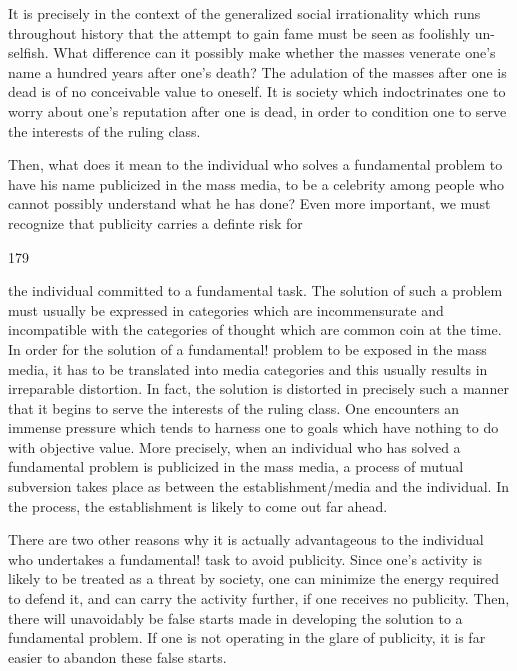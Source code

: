 \documentclass[10pt,twoside]{memoir}
\begin{document}
\begin{enumerate}
{{It is precisely in the context of the generalized social irrationality which 
runs throughout history that the attempt to gain fame must be seen as 
foolishly un-selfish. What difference can it possibly make whether the masses 
venerate one's name a hundred years after one's death? The adulation of the 
masses after one is dead is of no conceivable value to oneself. It is society 
which indoctrinates one to worry about one's reputation after one is dead, in 
order to condition one to serve the interests of the ruling class. 

Then, what does it mean to the individual who solves a fundamental 
problem to have his name publicized in the mass media, to be a celebrity 
among people who cannot possibly understand what he has done? Even 
more important, we must recognize that publicity carries a definte risk for 


179 


the individual committed to a fundamental task. The solution of such a 
problem must usually be expressed in categories which are incommensurate 
and incompatible with the categories of thought which are common coin at 
the time. In order for the solution of a fundamental! problem to be exposed 
in the mass media, it has to be translated into media categories and this 
usually results in irreparable distortion. In fact, the solution is distorted in 
precisely such a manner that it begins to serve the interests of the ruling 
class. One encounters an immense pressure which tends to harness one to 
goals which have nothing to do with objective value. More precisely, when an 
individual who has solved a fundamental problem is publicized in the mass 
media, a process of mutual subversion takes place as between the 
establishment/media and the individual. In the process, the establishment is 
likely to come out far ahead. 

There are two other reasons why it is actually advantageous to the 
individual who undertakes a fundamental! task to avoid publicity. Since one's 
activity is likely to be treated as a threat by society, one can minimize the 
energy required to defend it, and can carry the activity further, if one 
receives no publicity. Then, there will unavoidably be false starts made in 
developing the solution to a fundamental problem. If one is not operating in 
the glare of publicity, it is far easier to abandon these false starts. 

}}
\end{enumerate}
\end{document}
